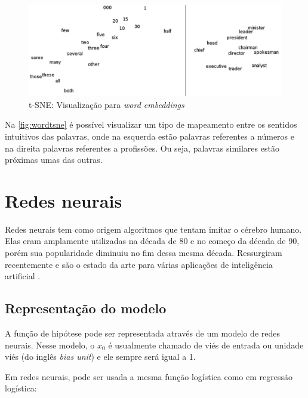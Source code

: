 \begin{figure}[htb]
  \caption{t-SNE: Visualização para \textit{word embeddings}}\label{fig:wordtsne}
  \begin{center}
      \includegraphics[scale=0.25]{img/Turian-WordTSNE}
  \end{center}
\end{figure}

Na \autoref{fig:wordtsne} é possível visualizar um tipo de mapeamento entre os sentidos intuitivos das palavras, onde na esquerda estão palavras referentes a números e na direita palavras referentes a profissões. Ou seja, palavras similares estão próximas umas das outras.









\section{Redes neurais}\label{sec:redesneurais}

Redes neurais tem como origem algoritmos que tentam imitar o cérebro humano. Elas eram amplamente utilizadas na década de 80 e no começo da década de 90, porém sua popularidade diminuiu no fim dessa mesma década. Ressurgiram recentemente e são o estado da arte para várias aplicações de inteligência artificial \cite{machinelearningcoursera}.

\subsection{Representação do modelo}

A função de hipótese pode ser representada através de um modelo de redes neurais. Nesse modelo, o $x_0$ é usualmente chamado de viés de entrada ou unidade viés (do inglês \textit{bias unit}) e ele sempre será igual a 1.

Em redes neurais, pode ser usada a mesma função logística como em regressão logística:

